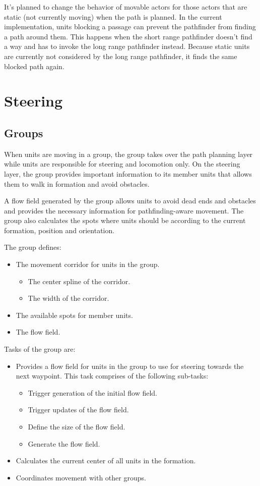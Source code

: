 \documentclass[a4paper,10pt]{article}
\begin{document}
It's planned to change the behavior of movable actors for those actors that are static (not currently moving) when the path is planned.
In the current implementation, units blocking a passage can prevent the pathfinder from finding a path around them.
This happens when the short range pathfinder doesn't find a way and has to invoke the long range pathfinder instead.
Because static units are currently not considered by the long range pathfinder, it finds the same blocked path again.

\section{Steering}

\subsection{Groups}
When units are moving in a group, the group takes over the path planning layer while units are responsible for steering and locomotion only.
On the steering layer, the group provides important information to its member units that allows them to walk in formation and avoid obstacles.

A flow field generated by the group allows units to avoid dead ends and obstacles and provides the necessary information for pathfinding-aware movement.
The group also calculates the spots where units should be according to the current formation, position and orientation.
 

The group defines:
\begin{itemize}
 \item The movement corridor for units in the group.
 \begin{itemize}
  \item The center spline of the corridor.
  \item The width of the corridor.
 \end{itemize}
 \item The available spots for member units.
 \item The flow field.
\end{itemize}

Tasks of the group are:
\begin{itemize}
 \item Provides a flow field for units in the group to use for steering towards the next waypoint.
This task comprises of the following sub-tasks:
 \begin{itemize}
  \item Trigger generation of the initial flow field.
  \item Trigger updates of the flow field.
  \item Define the size of the flow field.
  \item Generate the flow field.
 \end{itemize}
 \item Calculates the current center of all units in the formation.
 \item Coordinates movement with other groups.
\end{itemize}
\end{document}
